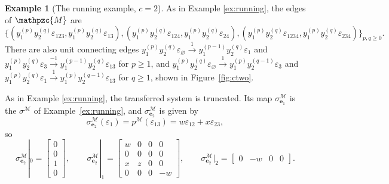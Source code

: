 \documentclass[12pt]{amsart}
\theoremstyle{plain}
\theoremstyle{definition}
\newtheorem{example}[theorem]{Example}
\newcommand{\M}{\mathcal{M}}
\newcommand{\lift}[1]{\mathpzc{#1}}
\newcommand{\eps}{\varepsilon}
\begin{document}
\begin{example}[The running example, $c = 2$]
As in Example \ref{ex:running}, the edges of $\lift{M}$ are $$ \{(y_1^{(p)}y_2^{(q)}\eps_{123}, y_1^{(p)}y_2^{(q)}\eps_{13}), (y_1^{(p)}y_2^{(q)}\eps_{124}, y_1^{(p)}y_2^{(q)}\eps_{24}), (y_1^{(p)}y_2^{(q)}\eps_{1234}, y_1^{(p)}y_2^{(q)}\eps_{234})\}_{p,q \geq 0}.$$
There are also unit connecting edges ${y_1^{(p)}y_2^{(q)} \eps_\varnothing \xrightarrow{1} y_1^{(p-1)}y_2^{(q)}\eps_1}$ and ${y_1^{(p)}y_2^{(q)} \eps_3 \xrightarrow{-1} y_1^{(p-1)}y_2^{(q)}\eps_{13}}$ for $p \ge 1$, and ${y_1^{(p)}y_2^{(q)} \eps_\varnothing \xrightarrow{1} y_1^{(p)}y_2^{(q-1)}\eps_3}$ and ${y_1^{(p)}y_2^{(q)} \eps_1 \xrightarrow{1} y_1^{(p)}y_2^{(q-1)}\eps_{13}}$ for $q \ge 1$, shown in Figure~\ref{fig:ctwo}.

As in Example \ref{ex:running}, the transferred system is truncated. Its map $\sigma^{\M}_{\boldsymbol{e}_1}$ is the $\sigma^{\M}$ of Example~\ref{ex:running}, and $\sigma^{\M}_{\boldsymbol{e}_2}$ is given by
    \[\sigma^{\M}_{\boldsymbol{e}_2}(\eps_1) = p^{\M}(\eps_{13}) = w \eps_{12} + x \eps_{23} ,
    \]
    so
    \[ \sigma^{\M}_{\boldsymbol{e}_2}|_0 = \begin{bmatrix} 0\\ 0\\ 1\\ 0 \end{bmatrix}, \qquad
        \sigma^{\M}_{\boldsymbol{e}_2}|_1 = \begin{bmatrix} w & 0 & 0 & 0\\ 0 & 0 & 0 & 0\\ x & z & 0 & 0\\ 0 & 0 & 0 & -w \end{bmatrix}, \qquad
        \sigma^{\M}_{\boldsymbol{e}_2}|_2 = \begin{bmatrix} 0 & -w & 0 & 0 \end{bmatrix}.
    \]


\end{example}
\end{document}
